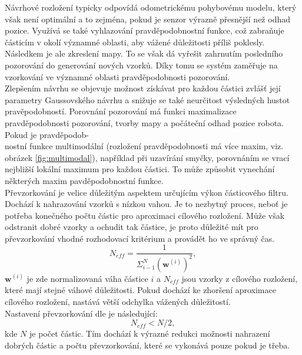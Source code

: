 \documentclass[12pt]{report}
\begin{document}
\indent Návrhové rozložení typicky odpovídá odometrickému pohybovému modelu, který však není optimální a to zejména, pokud je senzor výrazně přesnější než odhad pozice. Využívá se také vyhlazování pravděpodobnostní funkce, což zabraňuje částicím v okolí významné oblasti, aby vážené důležitosti příliš poklesly. Následkem je ale zkreslení mapy. To se však dá vyřešit zahrnutím posledního pozorování do generování nových vzorků. Díky tomu se systém zaměřuje na vzorkování ve významné oblasti pravděpodobnosti pozorování.\\
\indent Zlepšením návrhu se objevuje možnost získávat pro každou částici zvlášť její parametry Gaussovského návrhu a snižuje se také neurčitost výsledných hustot pravěpodobností. Porovnání pozorování má funkci maximalizace pravděpodobnosti pozorování, tvorby mapy a počáteční odhad pozice robota. Pokud je pravděpodob-\\nostní funkce multimodální (rozložení pravděpodobnosti má více maxim, viz. obrázek \ref{fig:multimodal}), například při uzavírání smyčky, porovnáním se vrací nejbližší lokální maximum pro každou částici. To může způsobit vynechání některých maxim pavděpodobnostní funkce.\\
\indent Převzorkování je velice důležitým aspektem určujícím výkon částicového filtru. Dochází k nahrazování vzorků s nízkou vahou. Je to nezbytný proces, neboť je potřeba konečného počtu částic pro aproximaci cílového rozložení. Může však odstranit dobré vzorky a ochudit tak částice, je proto důležité mít pro převzorkování vhodné rozhodovací kritérium a provádět ho ve správný čas. 
\begin{equation}
	N_{eff}=\frac{1}{\varSigma_{i-1}^N(\textbf{w}^{(i)})^2},
\end{equation} 
$\textbf{w}^{(i)}$ je zde normalizovaná váha částice $i$ a $N_{eff}$ jsou vzorky z cílového rozložení, které mají stejné váhové důležitosti. Pokud dochází ke zhoršení aproximace cílového rozložení, nastává větší odchylka vážených důležitostí.\\
Nastavení převzorkování dle \cite{Grisetti2007} je následující:
\begin{equation}
	N_{eff} < N/2,
\end{equation}
kde $N$ je počet částic. Tím dochází k výrazné redukci možnosti nahrazení dobrých částic a počtu převzorkování, které se vykonává pouze pokud je třeba.\\
\end{document}
